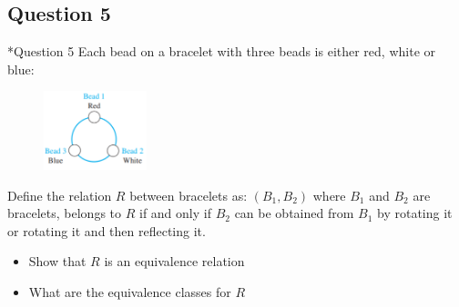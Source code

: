 \documentclass[xcolor=svgnames]{beamer}
\begin{document}
\subsection{Question 5}

\begin{frame}{*Question 5}
    Each bead on a bracelet with three beads is either red, white or blue:
    \begin{figure}
        \includegraphics[width=3cm]{dstut7q5.png}
        \label{fig:my_label}
    \end{figure}
    Define the relation $R$ between bracelets as: $(B_1, B_2)$ where $B_1$ and $B_2$ are bracelets, belongs to $R$ if and only if $B_2$ can be obtained from $B_1$ by rotating it or rotating it and then reflecting it. 
    \begin{itemize}
        \item Show that $R$ is an equivalence relation
        \item What are the equivalence classes for $R$
    \end{itemize}
\end{frame}
\end{document}
